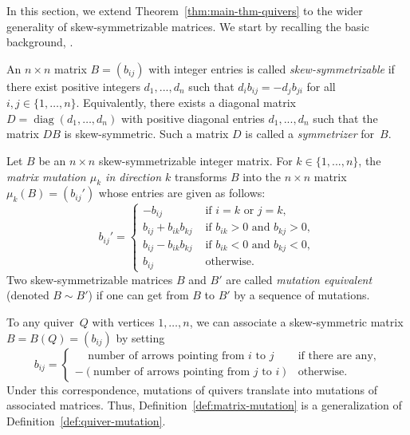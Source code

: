 \documentclass[ALCO,ThmDefs,Unicode,epreuves,published]{cedram}
\DeclareMathOperator{\diag}{diag}
\begin{document}
In this section, we extend Theorem~\ref{thm:main-thm-quivers} to the wider generality of skew-sym\-met\-rizable matrices. 
We start by recalling the basic background, \cf \eg \cite[Section~2.7]{FWZ}. 

\begin{definition} 
An $n \times n$ matrix $B = (b_{ij})$ with integer entries is called
\emph{skew-symmetrizable} if there exist positive integers $d_1,..., d_n$ such that $d_ib_{ij} = -d_j b_{ji}$ for all $i,j\in\{1,\dots,n\}$. 
Equivalently, there exists a diagonal matrix $D=\diag(d_1,\dots,d_n)$ with positive diagonal entries $d_1,...,d_n$ such that the matrix $DB$ is skew-symmetric. Such a matrix $D$ is called a \emph{symmetrizer} for~$B$. 
\end{definition}

\begin{definition} 
\label{def:matrix-mutation}
Let $B$ be an $n \times n$ skew-symmetrizable
integer matrix. 
For $k\in\{1,...,n\}$, the \emph{matrix mutation $\mu_k$ in direction $k$} transforms $B$ into
the $n \times n$ matrix $\mu_k(B)=(b_{ij}')$ whose entries are given as follows:
\begin{equation}
\label{eq:matrix-mutation}
b_{ij}'=
\begin{cases} -b_{ij} &\text{ if }i=k\text{ or }j=k, \\
b_{ij}+b_{ik}b_{kj} &\text{ if }b_{ik}>0\text{ and }b_{kj}>0,\\
b_{ij}-b_{ik}b_{kj} &\text{ if }b_{ik}<0\text{ and }b_{kj}<0,\\ 
b_{ij} &\text{ otherwise.} 
\end{cases}
\end{equation}
Two skew-symmetrizable matrices $B$ and $B'$ are called \emph{mutation
equivalent} (denoted \hbox{$B\sim B'$}) if one can get from $B$ to $B'$ by a sequence of mutations.
\end{definition}

\begin{remark}
To any quiver~$Q$ with vertices $1,\dots,n$, we can associate a skew-symmetric matrix $B=B(Q)=(b_{ij})$ by setting
\[
b_{ij}=\begin{cases}
\quad \, \text{number of arrows pointing from $i$ to~$j$} &\text{if there are any,}\\
-(\text{number of arrows pointing from $j$ to~$i$}) &\text{otherwise.}
\end{cases}
\]
Under this correspondence, mutations of quivers translate into mutations of associated matrices. Thus, Definition~\ref{def:matrix-mutation} is a generalization of Definition~\ref{def:quiver-mutation}. 
\end{remark}
\end{document}
